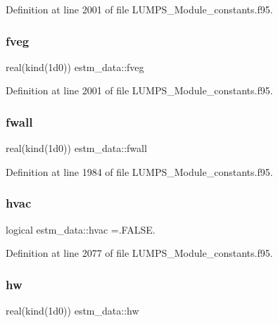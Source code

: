 Definition at line 2001 of file L\+U\+M\+P\+S\+\_\+\+Module\+\_\+constants.\+f95.

\mbox{\label{namespaceestm__data_ae5a720a9242a6d2110418f2d946a2575}} 
\subsubsection{\texorpdfstring{fveg}{fveg}}
{\footnotesize\ttfamily real(kind(1d0)) estm\+\_\+data\+::fveg}



Definition at line 2001 of file L\+U\+M\+P\+S\+\_\+\+Module\+\_\+constants.\+f95.

\mbox{\label{namespaceestm__data_a82d4728808abef718c63d66a77542383}} 
\subsubsection{\texorpdfstring{fwall}{fwall}}
{\footnotesize\ttfamily real(kind(1d0)) estm\+\_\+data\+::fwall}



Definition at line 1984 of file L\+U\+M\+P\+S\+\_\+\+Module\+\_\+constants.\+f95.

\mbox{\label{namespaceestm__data_a6280dc53c8da5314be8c10ef13ead25e}} 
\subsubsection{\texorpdfstring{hvac}{hvac}}
{\footnotesize\ttfamily logical estm\+\_\+data\+::hvac =.F\+A\+L\+S\+E.}



Definition at line 2077 of file L\+U\+M\+P\+S\+\_\+\+Module\+\_\+constants.\+f95.

\mbox{\label{namespaceestm__data_ae0ab410b6628c40338fc7cea2a358363}} 
\subsubsection{\texorpdfstring{hw}{hw}}
{\footnotesize\ttfamily real(kind(1d0)) estm\+\_\+data\+::hw}



